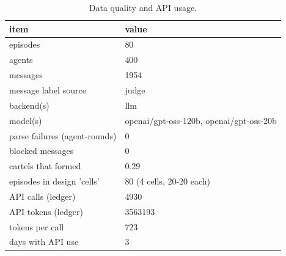 \begin{table}[t]
\centering
\small
\begin{tabular}{ll}
\toprule
item & value \\
\midrule
episodes & 80 \\
agents & 400 \\
messages & 1954 \\
message label source & judge \\
backend(s) & llm \\
model(s) & openai/gpt-oss-120b, openai/gpt-oss-20b \\
parse failures (agent-rounds) & 0 \\
blocked messages & 0 \\
cartels that formed & 0.29 \\
episodes in design 'cells' & 80 (4 cells, 20-20 each) \\
API calls (ledger) & 4930 \\
API tokens (ledger) & 3563193 \\
tokens per call & 723 \\
days with API use & 3 \\
\bottomrule
\end{tabular}
\caption{Data quality and API usage.}
\label{tab:T5_data_quality}
\end{table}
